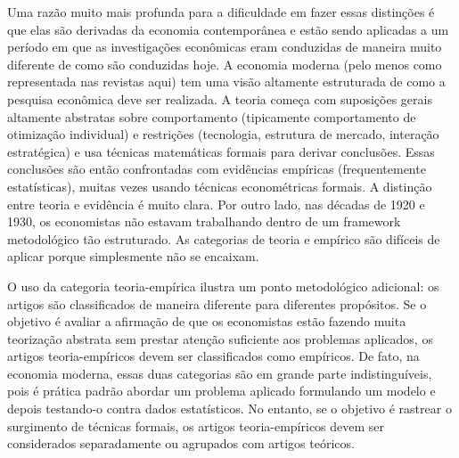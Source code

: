 \documentclass[12pt]{article}
\begin{document}
Uma razão muito mais profunda para a dificuldade em fazer essas distinções é que elas são derivadas da economia contemporânea e estão sendo aplicadas a um período em que as investigações econômicas eram conduzidas de maneira muito diferente de como são conduzidas hoje. A economia moderna (pelo menos como representada nas revistas aqui) tem uma visão altamente estruturada de como a pesquisa econômica deve ser realizada. A teoria começa com suposições gerais altamente abstratas sobre comportamento (tipicamente comportamento de otimização individual) e restrições (tecnologia, estrutura de mercado, interação estratégica) e usa técnicas matemáticas formais para derivar conclusões. Essas conclusões são então confrontadas com evidências empíricas (frequentemente estatísticas), muitas vezes usando técnicas econométricas formais. A distinção entre teoria e evidência é muito clara. Por outro lado, nas décadas de 1920 e 1930, os economistas não estavam trabalhando dentro de um framework metodológico tão estruturado. As categorias de teoria e empírico são difíceis de aplicar porque simplesmente não se encaixam.

O uso da categoria teoria-empírica ilustra um ponto metodológico adicional: os artigos são classificados de maneira diferente para diferentes propósitos. Se o objetivo é avaliar a afirmação de que os economistas estão fazendo muita teorização abstrata sem prestar atenção suficiente aos problemas aplicados, os artigos teoria-empíricos devem ser classificados como empíricos. De fato, na economia moderna, essas duas categorias são em grande parte indistinguíveis, pois é prática padrão abordar um problema aplicado formulando um modelo e depois testando-o contra dados estatísticos. No entanto, se o objetivo é rastrear o surgimento de técnicas formais, os artigos teoria-empíricos devem ser considerados separadamente ou agrupados com artigos teóricos.
\end{document}
